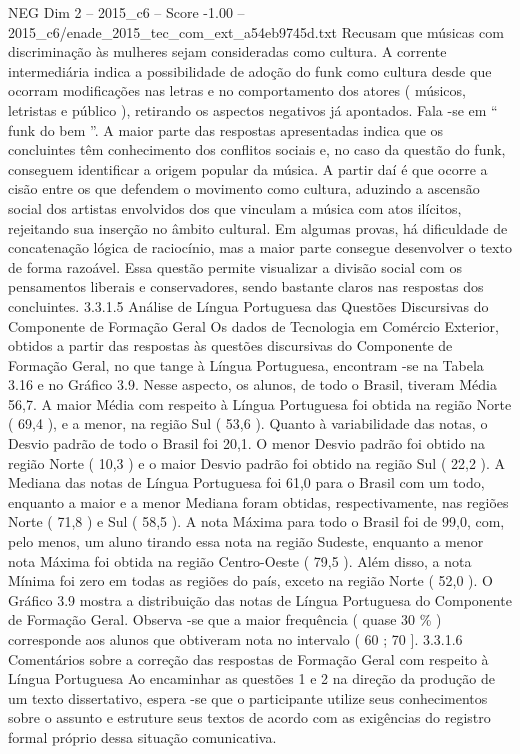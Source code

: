 \begin{textsample}{NEG Dim 2 – 2015\_c6 – Score -1.00 – 2015\_c6/enade\_2015\_tec\_com\_ext\_a54eb9745d.txt}
Recusam que músicas com discriminação às mulheres sejam consideradas como cultura.
A corrente intermediária indica a possibilidade de adoção do funk como cultura desde que ocorram modificações nas letras e no comportamento dos atores ( músicos, letristas e público ), retirando os aspectos negativos já apontados.
Fala -se em “ funk do bem ”.
A maior parte das respostas apresentadas indica que os concluintes têm conhecimento dos conflitos sociais e, no caso da questão do funk, conseguem identificar a origem popular da música.
A partir daí é que ocorre a cisão entre os que defendem o movimento como cultura, aduzindo a ascensão social dos artistas envolvidos dos que vinculam a música com atos ilícitos, rejeitando sua inserção no âmbito cultural.
Em algumas provas, há dificuldade de concatenação lógica de raciocínio, mas a maior parte consegue desenvolver o texto de forma razoável.
Essa questão permite visualizar a divisão social com os pensamentos liberais e conservadores, sendo bastante claros nas respostas dos concluintes. 3.3.1.5 Análise de Língua Portuguesa das Questões Discursivas do Componente de Formação Geral Os dados de Tecnologia em Comércio Exterior, obtidos a partir das respostas às questões discursivas do Componente de Formação Geral, no que tange à Língua Portuguesa, encontram -se na Tabela 3.16 e no Gráfico 3.9.
Nesse aspecto, os alunos, de todo o Brasil, tiveram Média 56,7.
A maior Média com respeito à Língua Portuguesa foi obtida na região Norte ( 69,4 ), e a menor, na região Sul ( 53,6 ).
Quanto à variabilidade das notas, o Desvio padrão de todo o Brasil foi 20,1.
O menor Desvio padrão foi obtido na região Norte ( 10,3 ) e o maior Desvio padrão foi obtido na região Sul ( 22,2 ).
A Mediana das notas de Língua Portuguesa foi 61,0 para o Brasil com um todo, enquanto a maior e a menor Mediana foram obtidas, respectivamente, nas regiões Norte ( 71,8 ) e Sul ( 58,5 ).
A nota Máxima para todo o Brasil foi de 99,0, com, pelo menos, um aluno tirando essa nota na região Sudeste, enquanto a menor nota Máxima foi obtida na região Centro-Oeste ( 79,5 ).
Além disso, a nota Mínima foi zero em todas as regiões do país, exceto na região Norte ( 52,0 ).
O Gráfico 3.9 mostra a distribuição das notas de Língua Portuguesa do Componente de Formação Geral.
Observa -se que a maior frequência ( quase 30 \% ) corresponde aos alunos que obtiveram nota no intervalo ( 60 ; 70 ]. 3.3.1.6 Comentários sobre a correção das respostas de Formação Geral com respeito à Língua Portuguesa Ao encaminhar as questões 1 e 2 na direção da produção de um texto dissertativo, espera -se que o participante utilize seus conhecimentos sobre o assunto e estruture seus textos de acordo com as exigências do registro formal próprio dessa situação comunicativa.

\end{textsample}
